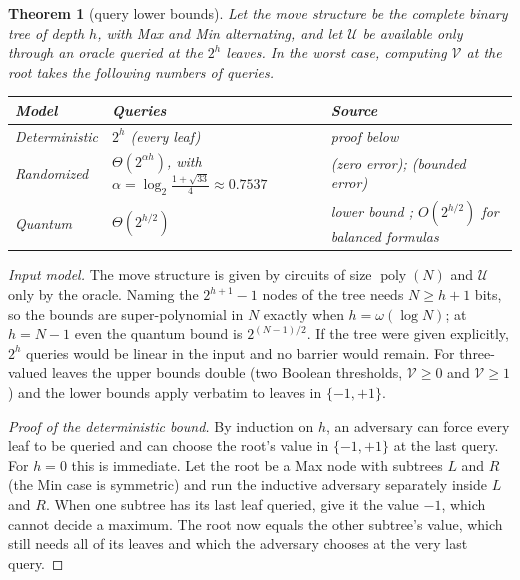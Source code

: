 \documentclass[11pt]{amsart}
\theoremstyle{plain}
\newtheorem{theorem}{Theorem}[section]
\theoremstyle{definition}
\theoremstyle{remark}
\numberwithin{equation}{section}
\newcommand{\val}{\mathcal{V}}            %
\newcommand{\pay}{\mathcal{U}}            %
\newcommand{\poly}{\operatorname{poly}}
\begin{document}
\begin{theorem}[query lower bounds]\label{thm:query}
Let the move structure be the complete binary tree of depth $h$, with Max and Min alternating, and let $\pay$ be available only through an oracle queried at the $2^h$ leaves. In the worst case, computing $\val$ at the root takes the following numbers of queries.
\begin{center}\small
\begin{tabularx}{\linewidth}{@{}l>{\raggedright\arraybackslash}X>{\raggedright\arraybackslash}X@{}}
\toprule
Model & Queries & Source\\ \midrule
Deterministic & $2^h$ (every leaf) & proof below\\
Randomized & $\Theta(2^{\alpha h})$, with $\alpha=\log_2\frac{1+\sqrt{33}}{4}\approx 0.7537$ & \cite{Snir,SaksWigderson} (zero error); \cite{Santha} (bounded error)\\
Quantum & $\Theta(2^{h/2})$ & lower bound \cite{BarnumSaks}; $O(2^{h/2})$ for balanced formulas \cite{ACRSZ,ReichardtSpalek}\\
\bottomrule
\end{tabularx}
\end{center}
\end{theorem}

\noindent\emph{Input model.} The move structure is given by circuits of size $\poly(N)$ and $\pay$ only by the oracle. Naming the $2^{h+1}-1$ nodes of the tree needs $N\ge h+1$ bits, so the bounds are super-polynomial in $N$ exactly when $h=\omega(\log N)$; at $h=N-1$ even the quantum bound is $2^{(N-1)/2}$. If the tree were given explicitly, $2^h$ queries would be linear in the input and no barrier would remain. For three-valued leaves the upper bounds double (two Boolean thresholds, $\val\ge 0$ and $\val\ge1$) and the lower bounds apply verbatim to leaves in $\{-1,+1\}$.

\begin{proof}[Proof of the deterministic bound]
By induction on $h$, an adversary can force every leaf to be queried and can choose the root's value in $\{-1,+1\}$ at the last query. For $h=0$ this is immediate. Let the root be a Max node with subtrees $L$ and $R$ (the Min case is symmetric) and run the inductive adversary separately inside $L$ and $R$. When one subtree has its last leaf queried, give it the value $-1$, which cannot decide a maximum. The root now equals the other subtree's value, which still needs all of its leaves and which the adversary chooses at the very last query.
\end{proof}
\end{document}

